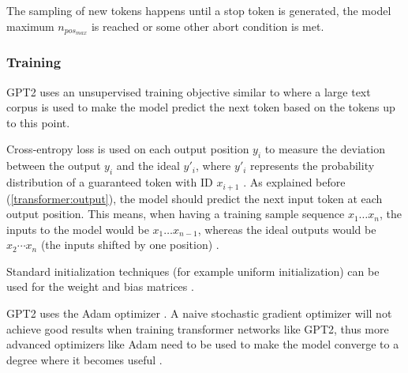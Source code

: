 The sampling of new tokens happens until a stop token is generated, the model maximum $n_{pos_{max}}$ is reached or some other abort condition is met. \cite[p.2 ]{allyouneed}


\subsubsection{Training}

GPT2 uses an unsupervised training objective similar to  where a large text corpus is used to make the model predict the next token based on the tokens up to this point.

Cross-entropy loss is used on each output position $y_i$ to measure the deviation between the output $y_i$ and the ideal $y'_i$,
where $y'_i$ represents the probability distribution of a guaranteed token with ID $x_{i+1}$  \cite{HuggingFaceGPT2}.
As explained before (\ref{transformer:output}), the model should predict the next input token at each output position. This means, when having a training sample sequence $x_1 \ldots x_n$, the inputs to the model would be $x_1 \ldots x_{n-1}$, whereas the ideal outputs would be $x_2 \cdots x_n$ (the inputs shifted by one position)  .

Standard initialization techniques (for example uniform initialization) can be used for the weight and bias matrices .

GPT2 uses the Adam optimizer .
A naive stochastic gradient optimizer will not achieve good results when training transformer networks like GPT2, thus more advanced optimizers like Adam need to be used to make the model converge to a degree where it becomes useful \cite{adambeatssgd}.